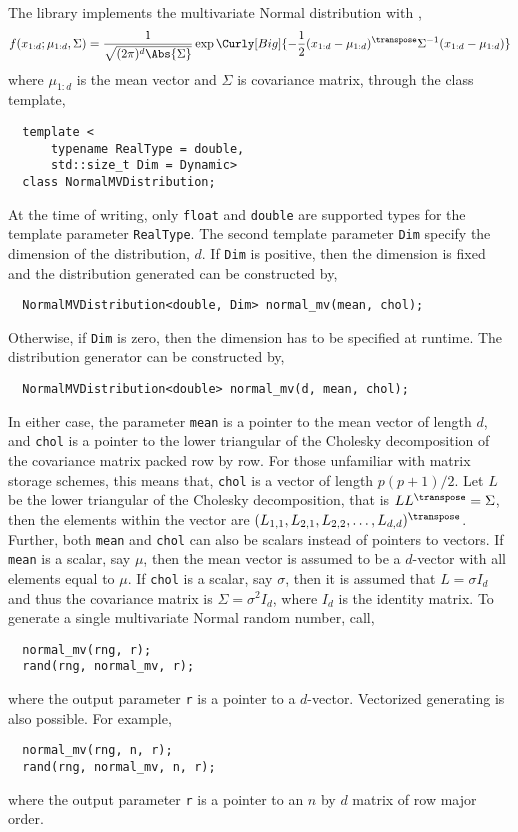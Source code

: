 The library implements the multivariate Normal distribution with \pdf,
\begin{equation*}
  f(x_{1:d};\mu_{1:d},\Sigma) = \frac{1}{\sqrt{(2\pi)^d\Abs{\Sigma}}}
  \exp\Curly[Big]{-\frac{1}{2}
    (x_{1:d} - \mu_{1:d})^{\transpose}\Sigma^{-1}(x_{1:d} - \mu_{1:d})}
\end{equation*}
where $\mu_{1:d}$ is the mean vector and $\Sigma$ is covariance matrix, through
the class template,
\begin{Verbatim}
  template <
      typename RealType = double,
      std::size_t Dim = Dynamic>
  class NormalMVDistribution;
\end{Verbatim}
At the time of writing, only \verb|float| and \verb|double| are supported types
for the template parameter \verb|RealType|. The second template parameter
\verb|Dim| specify the dimension of the distribution, $d$. If \verb|Dim| is
positive, then the dimension is fixed and the distribution generated can be
constructed by,
\begin{Verbatim}
  NormalMVDistribution<double, Dim> normal_mv(mean, chol);
\end{Verbatim}
Otherwise, if \verb|Dim| is zero, then the dimension has to be specified at
runtime. The distribution generator can be constructed by,
\begin{Verbatim}
  NormalMVDistribution<double> normal_mv(d, mean, chol);
\end{Verbatim}
In either case, the parameter \verb|mean| is a pointer to the mean vector of
length $d$, and \verb|chol| is a pointer to the lower triangular of the
Cholesky decomposition of the covariance matrix packed row by row. For those
unfamiliar with matrix storage schemes, this means that, \verb|chol| is a
vector of length $p(p+1)/2$. Let $L$ be the lower triangular of the Cholesky
decomposition, that is $LL^{\transpose} = \Sigma$, then the elements within the
vector are $(L_{1,1},L_{2,1},L_{2,2},\dots,L_{d,d})^{\transpose}$. Further,
both \verb|mean| and \verb|chol| can also be scalars instead of pointers to
vectors. If \verb|mean| is a scalar, say $\mu$, then the mean vector is assumed
to be a $d$-vector with all elements equal to $\mu$. If \verb|chol| is a
scalar, say $\sigma$, then it is assumed that $L = \sigma I_d$ and thus the
covariance matrix is $\Sigma = \sigma^2 I_d$, where $I_d$ is the identity
matrix. To generate a single multivariate Normal random number, call,
\begin{Verbatim}
  normal_mv(rng, r);
  rand(rng, normal_mv, r);
\end{Verbatim}
where the output parameter \verb|r| is a pointer to a $d$-vector. Vectorized
generating is also possible. For example,
\begin{Verbatim}
  normal_mv(rng, n, r);
  rand(rng, normal_mv, n, r);
\end{Verbatim}
where the output parameter \verb|r| is a pointer to an $n$ by $d$ matrix of row
major order.
